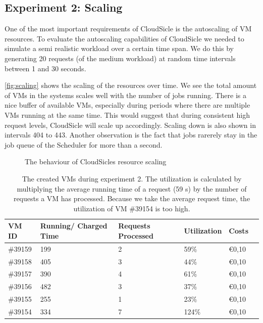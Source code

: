 \documentclass[twocolumn,twoside]{IEEEtran}
\begin{document}
\subsection{Experiment 2: Scaling}
One of the most important requirements of CloudSicle is the autoscaling of VM resources. To evaluate the autoscaling capabilities of CloudSicle we needed to simulate a semi realistic workload over a certain time span. We do this by generating 20 requests (of the medium workload) at random time intervals between 1 and 30 seconds.

\autoref{fig:scaling} shows the scaling of the resources over time. We see the total amount of VMs in the systems scales well with the number of jobs running. There is a nice buffer of available VMs, especially during periods where there are multiple VMs running at the same time. This would suggest that during consistent high request levels, CloudSicle will scale up accordingly. Scaling down is also shown in intervals 404 to 443. Another observation is the fact that jobs rarerely stay in the job queue of the Scheduler for more than a second.


\begin{figure}[ht]
\begin{center}
\begin{adjustwidth}{}{}
   \end{adjustwidth}
\caption{The behaviour of CloudSicles resource scaling}
\label{fig:scaling}
\end{center}
\end{figure}


\begin{table}
\caption{The created VMs during experiment 2. The utilization is calculated by multiplying the average running time of a request (59 s)  by the number of requests a VM has processed. Because we take the average request time, the utilization of VM \#39154 is too high.}
\begin{tabularx}{92mm}{|l||X|X|X|X|X|}
\hline 
VM ID & Running/ Charged Time & Requests Processed & Utilization & Costs \\
\hline 
\hline 
\#39159 & 199 & 2 & 59\% & \euro{0,10} \\
\hline 
\#39158 & 405 & 3 & 44\% &  \euro{0,10} \\
\hline 
\#39157 & 390 & 4 & 61\% & \euro{0,10} \\
\hline 
\#39156 & 482 & 3 & 37\% &  \euro{0,10} \\
\hline 
\#39155 & 255 & 1 & 23\%  &  \euro{0,10} \\
\hline 
\#39154 & 334 & 7 & 124\% &  \euro{0,10} \\
\hline 
\end{tabularx}
\end{table}
\end{document}
